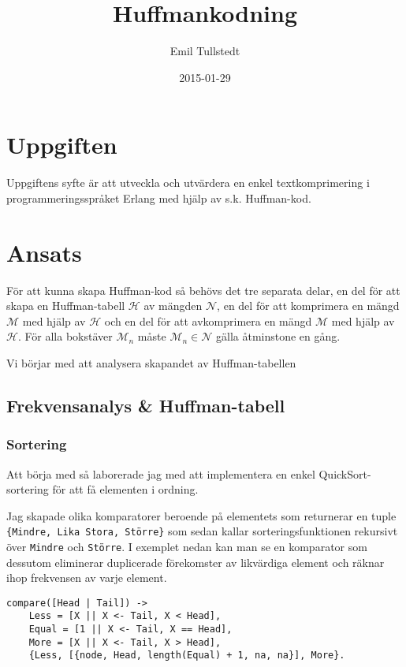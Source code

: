 \documentclass[a4paper, 11pt]{article}
\title{Huffmankodning}
\author{Emil Tullstedt}
\date{2015-01-29}
\begin{document}
\maketitle

\section{Uppgiften}

Uppgiftens syfte är att utveckla och utvärdera en enkel textkomprimering i programmeringsspråket Erlang med hjälp av s.k. Huffman-kod.

\section{Ansats}

För att kunna skapa Huffman-kod så behövs det tre separata delar, en del för att skapa en Huffman-tabell $\mathcal{H}$ av mängden $\mathcal{N}$, en del för att komprimera en mängd $\mathcal{M}$ med hjälp av $\mathcal{H}$ och en del för att avkomprimera en mängd $\mathcal{M}$ med hjälp av $\mathcal{H}$. För alla bokstäver $\mathcal{M}_n$ måste $\mathcal{M}_n \in \mathcal{N}$ gälla åtminstone en gång.

Vi börjar med att analysera skapandet av Huffman-tabellen

\subsection{Frekvensanalys \& Huffman-tabell}

\subsubsection{Sortering}

Att börja med så laborerade jag med att implementera en enkel QuickSort-sortering för att få elementen i ordning.

Jag skapade olika komparatorer beroende på elementets som returnerar en tuple \texttt{\{Mindre, Lika Stora, Större\}} som sedan kallar sorteringsfunktionen rekursivt över \texttt{Mindre} och \texttt{Större}. I exemplet nedan kan man se en komparator som dessutom eliminerar duplicerade förekomster av likvärdiga element och räknar ihop frekvensen av varje element.

\begin{lstlisting}
compare([Head | Tail]) ->                                                          
    Less = [X || X <- Tail, X < Head],                                          
    Equal = [1 || X <- Tail, X == Head],                                           
    More = [X || X <- Tail, X > Head],                                           
    {Less, [{node, Head, length(Equal) + 1, na, na}], More}. 
\end{lstlisting}
\end{document}
